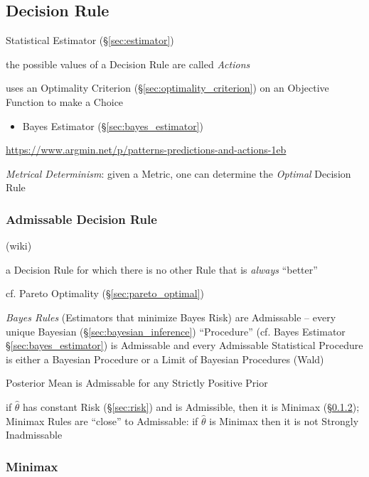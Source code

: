 \subsection{Decision Rule}\label{sec:decision_rule}

Statistical Estimator (\S\ref{sec:estimator})

the possible values of a Decision Rule are called \emph{Actions}

uses an Optimality Criterion (\S\ref{sec:optimality_criterion}) on an Objective
Function to make a Choice

\begin{itemize}
  \item Bayes Estimator (\S\ref{sec:bayes_estimator})
\end{itemize}

\url{https://www.argmin.net/p/patterns-predictions-and-actions-1eb}

\emph{Metrical Determinism}: given a Metric, one can determine the
\emph{Optimal} Decision Rule



\subsubsection{Admissable Decision Rule}\label{sec:admissable}

(wiki)

a Decision Rule for which there is no other Rule that is \emph{always}
``better''

cf. Pareto Optimality (\S\ref{sec:pareto_optimal})

\emph{Bayes Rules} (Estimators that minimize Bayes Risk) are Admissable -- every
unique Bayesian (\S\ref{sec:bayesian_inference}) ``Procedure'' (cf. Bayes
Estimator \S\ref{sec:bayes_estimator}) is Admissable and every Admissable
Statistical Procedure is either a Bayesian Procedure or a Limit of Bayesian
Procedures (Wald)

Posterior Mean is Admissable for any Strictly Positive Prior

if $\hat{\theta}$ has constant Risk (\S\ref{sec:risk}) and is Admissible, then
it is Minimax (\S\ref{sec:minimax});
Minimax Rules are ``close'' to Admissable: if $\hat{\theta}$ is Minimax then it
is not Strongly Inadmissable



\subsubsection{Minimax}\label{sec:minimax}

